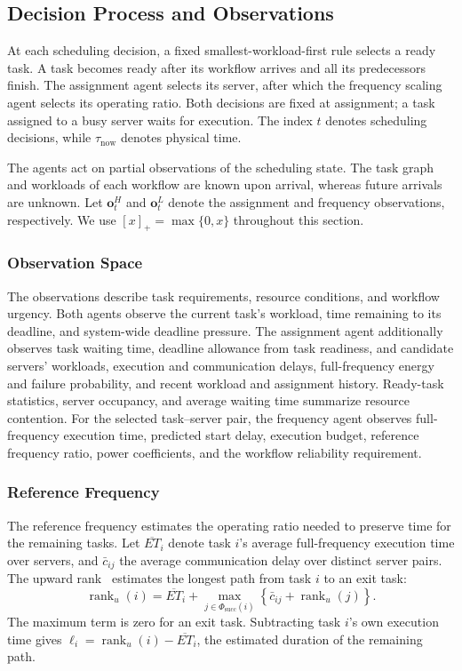 \documentclass[journal]{IEEEtran}
\begin{document}
\subsection{Decision Process and Observations}
\label{subsec:framework}

At each scheduling decision, a fixed smallest-workload-first rule selects a ready task. A task becomes ready after its workflow arrives and all its predecessors finish. The assignment agent selects its server, after which the frequency scaling agent selects its operating ratio. Both decisions are fixed at assignment; a task assigned to a busy server waits for execution. The index $t$ denotes scheduling decisions, while $\tau_{\mathrm{now}}$ denotes physical time.

The agents act on partial observations of the scheduling state. The task graph and workloads of each workflow are known upon arrival, whereas future arrivals are unknown. Let $\boldsymbol o_t^H$ and $\boldsymbol o_t^L$ denote the assignment and frequency observations, respectively. We use $[x]_+=\max\{0,x\}$ throughout this section.

\subsubsection{Observation Space}

The observations describe task requirements, resource conditions, and workflow urgency. Both agents observe the current task's workload, time remaining to its deadline, and system-wide deadline pressure. The assignment agent additionally observes task waiting time, deadline allowance from task readiness, and candidate servers' workloads, execution and communication delays, full-frequency energy and failure probability, and recent workload and assignment history. Ready-task statistics, server occupancy, and average waiting time summarize resource contention. For the selected task--server pair, the frequency agent observes full-frequency execution time, predicted start delay, execution budget, reference frequency ratio, power coefficients, and the workflow reliability requirement.

\subsubsection{Reference Frequency}

The reference frequency estimates the operating ratio needed to preserve time for the remaining tasks. Let $\overline{ET}_i$ denote task $i$'s average full-frequency execution time over servers, and $\bar c_{ij}$ the average communication delay over distinct server pairs. The upward rank~\cite{topcuoglu2002} estimates the longest path from task $i$ to an exit task:
\begin{equation*}
    \operatorname{rank}_u(i)
    =
    \overline{ET}_i+
    \max_{j\in\Phi_{\mathrm{succ}}(i)}
    \left\{\bar c_{ij}+\operatorname{rank}_u(j)\right\}.
\end{equation*}
The maximum term is zero for an exit task. Subtracting task $i$'s own execution time gives $\ell_i=\operatorname{rank}_u(i)-\overline{ET}_i$, the estimated duration of the remaining path.
\end{document}
